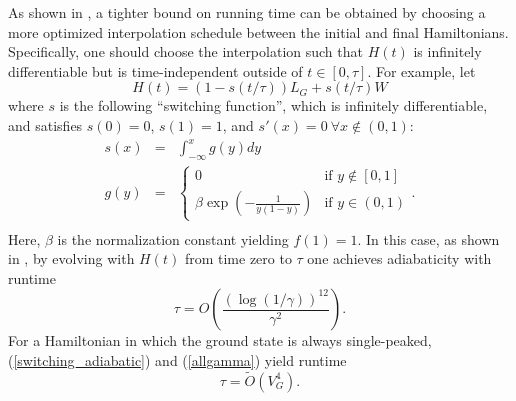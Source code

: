 As shown in \cite{Elgart_Hagedorn}, a tighter bound on running time
can be obtained by choosing a more optimized interpolation schedule
between the initial and final Hamiltonians. Specifically, one should
choose the interpolation such that $H(t)$ is infinitely differentiable
but is time-independent outside of $t \in [0,\tau]$. For example,
let
\begin{equation}
H(t) = (1-s(t/\tau)) L_G + s(t/\tau) W
\end{equation}
where $s$ is the following ``switching function'', which is infinitely
differentiable, and satisfies $s(0) = 0$, $s(1) = 1$, and
$s'(x) = 0 \  \forall x \notin (0,1)$:
\begin{eqnarray}
s(x) & = & \int_{-\infty}^x g(y) dy \\
g(y) & = & \left\{ \begin{array}{ll}
0 & \textrm{if $y \notin [0,1]$} \\
\beta \exp \left( - \frac{1}{y(1-y)} \right) & \textrm{if $y \in (0,1)$}
\end{array} \right. . \\
\end{eqnarray}
Here, $\beta$ is the normalization constant yielding $f(1) = 1$.
In this case, as shown in \cite{Elgart_Hagedorn}, by evolving with
$H(t)$ from time zero to $\tau$ one achieves adiabaticity with
runtime
\begin{equation}
\label{switching_adiabatic}
\tau = O\left( \frac{(\log(1/\gamma))^{12}}{\gamma^2} \right).
\end{equation}
For a Hamiltonian in which the ground state is always single-peaked,
(\ref{switching_adiabatic}) and (\ref{allgamma}) yield runtime
\begin{equation}
\label{fast}
\tau = \widetilde{O}(V_G^4).
\end{equation}



